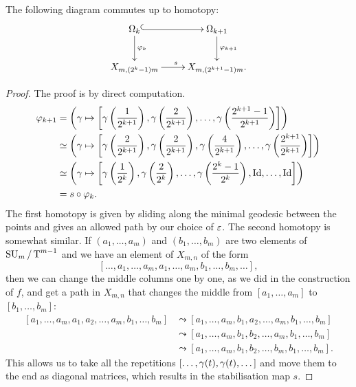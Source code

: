 \begin{lemma}
  \label{lem:com}
  The following diagram commutes up to homotopy:
  \[ \xymatrix{\Omega_k \ar@{^(->}[r] \ar[d]^{\varphi_k} & \Omega_{k+1}
  \ar[d]^{\varphi_{k+1}} \\
  X_{m,(2^k-1)m} \ar[r]^{s} & X_{m,(2^{k+1}-1)m}. } \]
\end{lemma}
\begin{proof}
  The proof is by direct computation.
  \begin{align*}
    \varphi_{k+1} &= \left( \gamma \mapsto \left[
        \gamma\left(\frac{1}{2^{k+1}}\right),
        \gamma\left(\frac{2}{2^{k+1}}\right), \dots,
        \gamma\left(\frac{2^{k+1}-1}{2^{k+1}}\right) \right]\right) \\
    &\simeq \left(\gamma \mapsto \left[ \gamma\left(\frac{2}{2^{k+1}}\right),
      \gamma\left(\frac{2}{2^{k+1}}\right),
      \gamma\left(\frac{4}{2^{k+1}}\right), \dots,
      \gamma\left(\frac{2^{k+1}}{2^{k+1}}\right) \right]\right) \\
    &\simeq \left(\gamma\mapsto \left[ \gamma\left(\frac{1}{2^{k}}\right),
      \gamma\left(\frac{2}{2^{k}}\right), \dots,
      \gamma\left(\frac{2^k-1}{2^k}\right), \operatorname{Id},\dots,\operatorname{Id} \right] \right)\\
    &= s\circ \varphi_k.
  \end{align*}
  The first homotopy is given by sliding along the minimal geodesic
  between the points and gives an allowed path by our choice of
  $\varepsilon$. The second homotopy is somewhat similar. If $(a_1,\dots,a_m)$
  and $(b_1,\dots,b_m)$ are two elements of $\operatorname{SU}_{m}/\operatorname{T}^{m-1}$ and we have an
  element of $X_{m,n}$ of the form
  \[ \left[ \dots, a_1,\dots,a_m,a_1,\dots,a_m,b_1,\dots,b_m,\dots
  \right], \]
  then we can change the middle columns one by one, as we did in
  the construction of $f$, and get a path in $X_{m,n}$ that changes
  the middle from $[a_1,\dots,a_m]$ to $[b_1,\dots,b_m]$:
  \begin{align*}
    \left[a_1,\dots,a_m,a_1,a_2,\dots,a_m,b_1,\dots,b_m \right] 
    &\leadsto
    \left[a_1,\dots,a_m,b_1,a_2,\dots,a_m,b_1,\dots,b_m\right] \\ 
    &\leadsto
    \left[a_1,\dots,a_m,b_1,b_2,\dots,a_m,b_1,\dots,b_m\right] \\  
    &\leadsto
    \left[a_1,\dots,a_m,b_1,b_2,\dots,b_m,b_1,\dots,b_m\right].  
  \end{align*}
  This allows us to take all the repetitions
  $\left[\dots,\gamma(t),\gamma(t),\dots\right]$ and move them to the end as
  diagonal matrices, which results in the stabilisation map $s$.
\end{proof}

